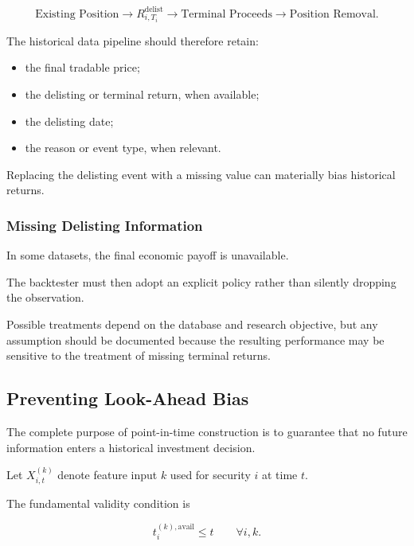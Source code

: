 \documentclass[11pt,a4paper]{article}
\begin{document}
\begin{equation}
\boxed{
\text{Existing Position}
\rightarrow
R_{i,T_i}^{\mathrm{delist}}
\rightarrow
\text{Terminal Proceeds}
\rightarrow
\text{Position Removal}.
}
\end{equation}

The historical data pipeline should therefore retain:

\begin{itemize}
    \item the final tradable price;
    \item the delisting or terminal return, when available;
    \item the delisting date;
    \item the reason or event type, when relevant.
\end{itemize}

Replacing the delisting event with a missing value can materially bias
historical returns.


\subsubsection{Missing Delisting Information}

In some datasets, the final economic payoff is unavailable.

The backtester must then adopt an explicit policy rather than silently dropping
the observation.

Possible treatments depend on the database and research objective, but any
assumption should be documented because the resulting performance may be
sensitive to the treatment of missing terminal returns.


\subsection{Preventing Look-Ahead Bias}
\label{subsec:pit_preventing_lookahead}

The complete purpose of point-in-time construction is to guarantee that no
future information enters a historical investment decision.

Let $X_{i,t}^{(k)}$ denote feature input $k$ used for security $i$ at time $t$.

The fundamental validity condition is

\begin{equation}
\boxed{
t_{i}^{(k),\mathrm{avail}}
\leq
t
\qquad
\forall i,k.
}
\end{equation}
\end{document}
